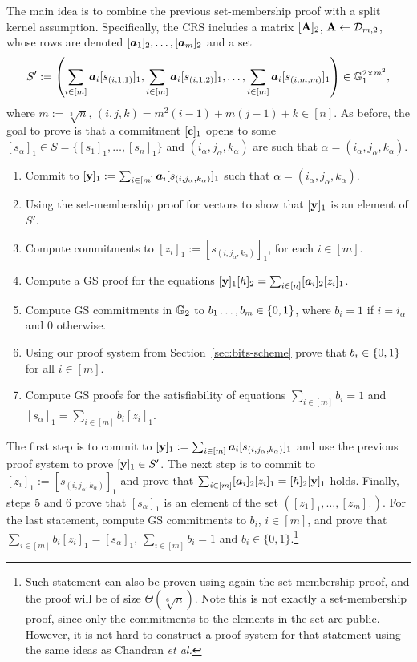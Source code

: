 The main idea is to combine the previous set-membership proof with a split kernel assumption. Specifically, the CRS includes a matrix $[\mathbf{{A}}]_2$, $\mathbf{{A}} \gets\mathcal{D}_{m,2}$, whose rows are denoted $[{\boldsymbol a}_1]_2,\ldots,[{\boldsymbol a}_m]_2$ and a set 
$$S':=\left(\sum_{i\in[m]}{\boldsymbol a}_i[s_{(i,1,1)}]_1,\sum_{i\in[m]}{\boldsymbol a}_i[s_{(i,1,2)}]_1,\ldots,\sum_{i\in[m]}{\boldsymbol a}_i[s_{(i,m,m)}]_1\right)\in\mathbb{G}_1^{2\times m^2},$$
where $m:=\sqrt[3]{n}$, $(i,j,k)=m^2(i-1)+m(j-1)+k\in[n]$. As before, the goal to prove is that a commitment $[\mathbf{c}]_1$ opens to some $[s_{\alpha}]_1 \in S=\{[s_1]_1,\ldots,[s_n]_1\}$ and  $(i_{\alpha},j_{\alpha},k_{\alpha})$ are such that $\alpha=(i_{\alpha},j_{\alpha},k_{\alpha})$.

\begin{enumerate}
\item Commit to $[\mathbf{y}]_1:=\sum_{i\in[m]}{\boldsymbol a}_i[s_{(i,j_\alpha,k_\alpha)}]_1$ such that $\alpha=(i_\alpha,j_\alpha,k_\alpha)$.
\item Using the set-membership proof for vectors to show that $[\mathbf{y}]_1$ is an element of $S'$.
\item Compute commitments to $[z_i]_1:=[s_{(i,j_\alpha,k_\alpha)}]_1$, for each $i\in[m]$.
\item Compute a GS proof for the equations $[\mathbf{y}]_1[h]_2=\sum_{i\in[n]}[{\boldsymbol a}_i]_2 [z_i]_1$. 
\item Compute GS commitments in $\mathbb{G}_2$ to $b_1\ldots,b_m\in\{0,1\}$,
      where $b_i = 1$ if $i=i_\alpha$ and $0$ otherwise.
\item Using our proof system from Section~\ref{sec:bits-scheme} prove that $b_i\in\{0,1\}$ for all $i\in[m]$.
\item Compute GS proofs for the satisfiability of equations $\sum_{i\in[m]}b_i=1$ and $[s_{\alpha}]_1=\sum_{i\in[m]}b_i[z_i]_1$.
\end{enumerate}

The first step is to commit to $[\mathbf{y}]_1:= \sum_{i\in[m]} {\boldsymbol a}_i [s_{(i,j_\alpha,k_\alpha)}]_1$ and use the previous proof system to prove $[\mathbf{y}]_1 \in S'$. The next step is to commit to $[z_i]_1:=[s_{(i,j_\alpha,k_\alpha)}]_1$ and prove that $\sum_{i\in[m]}[{\boldsymbol a}_i]_2[z_i]_1 = [h]_2[\mathbf{y}]_1$ holds. Finally, steps 5 and 6 prove that $[s_{\alpha}]_1$ is an element of the set $([z_1]_1,\ldots,[z_m]_1)$. For the last statement, compute GS commitments to $b_i$, $i \in [m]$, 
and prove that $\sum_{i\in[m]}b_i[z_i]_1=[s_{\alpha}]_1$, $\sum_{i\in[m]}b_i=1$ and $b_i \in \{0,1\}$.\footnote{Such statement can also be proven using again the set-membership proof, and the proof will be of size $\Theta(\sqrt[6]{n})$. Note this is not exactly a set-membership proof, since only the commitments to the elements in the set are public. However, it is not hard to construct a proof system for that statement using the same ideas as Chandran \textit{et al.} }

